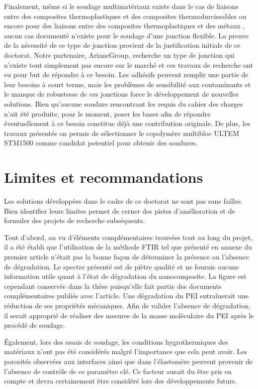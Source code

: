 Finalement, même si le soudage multimatériaux existe dans le cas de liaisons entre des composites thermoplastiques et des composites thermodurcissables \cite{FernandezVillegas2015,Lionetto2018a} ou encore pour des liaisons entre des composites thermoplastiques et des métaux \cite{Weidmann2018,Kruger2004,Balle2009,Goushegir2016}, aucun cas documenté n'existe pour le soudage d'une jonction flexible. 
La preuve de la nécessité de ce type de jonction provient de la justification initiale de ce doctorat.
Notre partenaire, ArianeGroup, recherche un type de jonction qui n'existe tout simplement pas encore sur le marché et ces travaux de recherche ont eu pour but de répondre à ce besoin. 
Les adhésifs peuvent remplir une partie de leur besoins à court terme, mais les problèmes de sensibilité aux contaminants et le manque de robustesse de ces jonctions force le développement de nouvelles solutions. 
Bien qu'aucune soudure rencontrant les requis du cahier des charges n'ait été produite, pour le moment, poser les bases afin de répondre éventuellement à ce besoin constitue déjà une contribution originale. 
De plus, les travaux présentés on permis de sélectionner le copolymère multibloc ULTEM STM1500 comme candidat potentiel pour obtenir des soudures. 

\section{Limites et recommandations}

Les solutions développées dans le cadre de ce doctorat ne sont pas sans failles. 
Bien identifier leurs limites permet de cerner des pistes d'amélioration et de formuler des projets de recherche subséquents. 

Tout d'abord, au vu d'éléments complémentaires trouvées tout au long du projet, il a été établi que l'utilisation de la méthode FTIR tel que présenté en annexe du premier article n'était pas la bonne façon de déterminer la présence ou l'absence de dégradation. 
Le spectre présenté est de piètre qualité et ne fournis aucune information utile quant à l'état de dégradation du nanocomposite. 
La figure est cependant conservée dans la thèse puisqu'elle fait partie des documents complémentaires publiés avec l'article. 
Une dégradation du PEI entraînerait une réduction de ses propriétés mécaniques. 
Afin de valider l'absence de dégradation, il serait approprié de réaliser des mesures de la masse moléculaire du PEI après le procédé de soudage. 

Également, lors des essais de soudage, les conditions hygrothermiques des matériaux n'ont pas été considérés malgré l'importance que cela peut avoir. 
Les porosités observées aux interfaces ainsi que dans l'élastomère peuvent provenir de l'absence de contrôle de ce paramètre clé. 
Ce facteur aurait du être pris en compte et devra certainement être considéré lors des développements futurs. 

